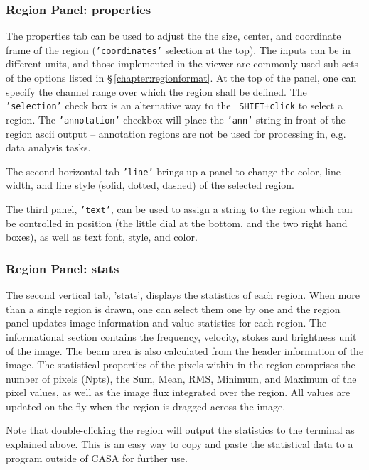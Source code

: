 \subsubsection{Region Panel: properties}
\label{section:display.image.rgnmgr.props}

The properties tab can be used to adjust the the size, center, and
coordinate frame of the region ({\tt 'coordinates'} selection at the
top). The inputs can be in different units, and those implemented in
the viewer are commonly used sub-sets of the options listed
in \S\,\ref{chapter:regionformat}. At the top of the panel, one can
specify the channel range over which the region shall be defined. The {\tt
  'selection'} check box is an alternative way to the {\tt
  SHIFT+click} to select a region. The {\tt 'annotation'} checkbox
will place the {\tt 'ann'} string in front of the region ascii output
-- annotation regions are not be used for processing in, e.g. data
analysis tasks.


The second horizontal tab {\tt 'line'} brings up a panel to change the
color, line width, and line style (solid, dotted, dashed) of the
selected region. 

The third panel, {\tt 'text'}, can be used to assign a string to the
region which can be controlled in position (the little dial at the
bottom, and the two right hand boxes), as well as text font, style,
and color. 


\subsubsection{Region Panel: stats}
\label{section:display.image.rgnmgr.stats}

The second vertical tab, 'stats', displays the statistics of each
region. When more than a single region is drawn, one can select them
one by one and the region panel updates image information and value
statistics for each region. The informational section contains the
frequency, velocity, stokes and brightness unit of the image. The beam
area is also calculated from the header information of the image. The
statistical properties of the pixels within in the region comprises
the number of pixels (Npts), the Sum, Mean, RMS, Minimum, and Maximum
of the pixel values, as well as the image flux integrated over the
region. All values are updated on the fly when the region is dragged
across the image.

Note that double-clicking the region will output the 
statistics to the terminal as explained above. This is an easy way to
copy and paste the statistical data to a program outside of CASA for
further use. 


